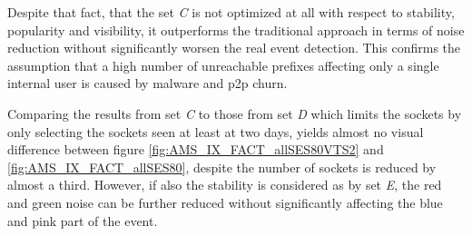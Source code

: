 Despite that fact, that the set \emph{C} is not optimized at all with respect to stability, popularity and visibility, it outperforms the traditional approach in terms of noise reduction without significantly worsen the real event detection. This confirms the assumption that a high number of unreachable prefixes affecting only a single internal user is caused by malware and p2p churn.

Comparing the results from set \emph{C} to those from set \emph{D} which limits the sockets by only selecting the sockets seen at least at two days, yields almost no visual difference between figure \ref{fig:AMS_IX_FACT_allSES80VTS2} and \ref{fig:AMS_IX_FACT_allSES80}, despite the number of sockets is reduced by almost a third. However, if also the stability is considered as by set \emph{E}, the red and green noise can be further reduced without significantly affecting the blue and pink part of the event.

